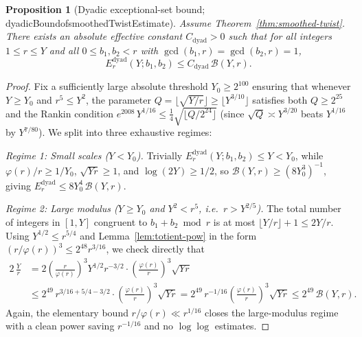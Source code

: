 \documentclass[11pt,reqno]{amsart}
\numberwithin{equation}{section}
\newtheorem{proposition}[theorem]{Proposition}
\theoremstyle{definition}
\newcommand{\1}{\mathbf{1}}
\newcommand{\lean}[1]{{\footnotesize\ttfamily\renewcommand{\_}{\textunderscore\allowbreak}#1}}
\begin{document}
\begin{proposition}[Dyadic exceptional-set bound; \lean{dyadicBound\_of\_smoothedTwistEstimate}]
\label{prop:dyadic}
Assume Theorem~\ref{thm:smoothed-twist}. There exists an absolute effective constant $C_{\mathrm{dyad}} > 0$ such that for all integers $1 \le r \le Y$ and all $0 \le b_1, b_2 < r$ with $\gcd(b_1, r) = \gcd(b_2, r) = 1$,
\begin{equation}\label{eq:dyadic-bound}
  E_r^{\mathrm{dyad}}(Y; b_1, b_2) \le C_{\mathrm{dyad}}\, \mathcal{B}(Y, r).
\end{equation}
\end{proposition}

\begin{proof}
Fix a sufficiently large absolute threshold $Y_0 \ge 2^{100}$ ensuring that whenever $Y \ge Y_0$ and $r^5 \le Y^2$, the parameter $Q = \lfloor\sqrt{Y/r}\rfloor \ge \lfloor Y^{3/10}\rfloor$ satisfies both $Q \ge 2^{25}$ and the Rankin condition $e^{2008}\, Y^{1/16} \le \frac{1}{4}\sqrt{\lfloor Q/2^{24}\rfloor}$ (since $\sqrt{Q} \asymp Y^{3/20}$ beats $Y^{1/16}$ by $Y^{7/80}$). We split into three exhaustive regimes:

\emph{Regime 1: Small scales ($Y < Y_0$).}
Trivially $E_r^{\mathrm{dyad}}(Y; b_1, b_2) \le Y < Y_0$, while $\varphi(r)/r \ge 1/Y_0$, $\sqrt{Yr} \ge 1$, and $\log(2Y) \ge 1/2$, so $\mathcal{B}(Y, r) \ge (8 Y_0^3)^{-1}$, giving $E_r^{\mathrm{dyad}} \le 8 Y_0^4\,\mathcal{B}(Y, r)$.

\emph{Regime 2: Large modulus ($Y \ge Y_0$ and $Y^2 < r^5$, i.e.\ $r > Y^{2/5}$).}
The total number of integers in $[1, Y]$ congruent to $b_1 + b_2 \bmod r$ is at most $\lfloor Y/r\rfloor + 1 \le 2Y/r$. Using $Y^{1/2} \le r^{5/4}$ and Lemma~\ref{lem:totient-pow} in the form $(r/\varphi(r))^3 \le 2^{48} r^{3/16}$, we check directly that
\begin{align*}
  2\,\frac{Y}{r}
  &= 2\left(\frac{r}{\varphi(r)}\right)^3 Y^{1/2} r^{-3/2} \cdot \left(\frac{\varphi(r)}{r}\right)^3 \sqrt{Y r} \\
  &\le 2^{49}\, r^{3/16 + 5/4 - 3/2} \cdot \left(\frac{\varphi(r)}{r}\right)^3 \sqrt{Y r}
  = 2^{49}\, r^{-1/16} \left(\frac{\varphi(r)}{r}\right)^3 \sqrt{Y r}
  \le 2^{49}\, \mathcal{B}(Y, r).
\end{align*}
Again, the elementary bound $r/\varphi(r) \ll r^{1/16}$ closes the large-modulus regime with a clean power saving $r^{-1/16}$ and no $\log\log$ estimates.


\end{proof}
\end{document}
